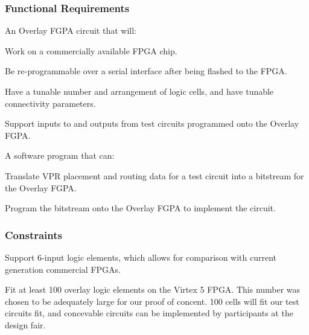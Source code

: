 \subsubsection{Functional Requirements}

An Overlay FGPA circuit that will:

\begin{itemlist}
	\item Work on a commercially available FPGA chip.
	\item Be re-programmable over a serial interface after being flashed to the FPGA.
	\item Have a tunable number and arrangement of logic cells, and have tunable connectivity parameters. 
	\item Support inputs to and outputs from test circuits programmed onto the Overlay FGPA.
\end{itemlist}

A software program that can:
\begin{itemlist}
	\item Translate VPR placement and routing data for a test circuit into a bitstream for the Overlay FGPA.
	\item Program the bitstream onto the Overlay FGPA to implement the circuit.
\end{itemlist}

\subsubsection{Constraints}

\begin{itemlist}
	\item Support 6-input logic elements, which allows for comparison with current generation commercial FPGAs.
	\item Fit at least 100 overlay logic elements on the Virtex 5 FPGA.  This number was chosen to be adequately large for our proof of concent.  100 cells will fit our test circuits fit, and concevable circuits can be implemented by participants at the design fair.
\end{itemlist}


